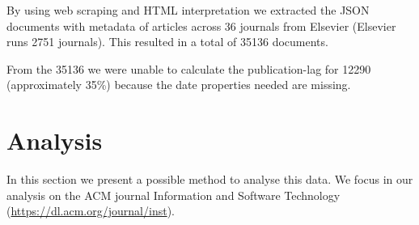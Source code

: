 \documentclass{ou-report}
\newcommand{\outline}[1]{{\color{blue} #1}}
\begin{document}
By using web scraping and HTML interpretation we extracted the JSON documents 
with metadata of articles across 36 journals from Elsevier (Elsevier runs 2751 
journals). This resulted in a total of 35136 documents.







From the 35136 we were unable to calculate the publication-lag for 12290
(approximately 35\%) because the date properties needed are missing.




\section{Analysis}
In this section we present a possible method to analyse this data. We focus in
our analysis on the ACM journal Information and Software Technology
(\url{https://dl.acm.org/journal/inst}).
\end{document}
